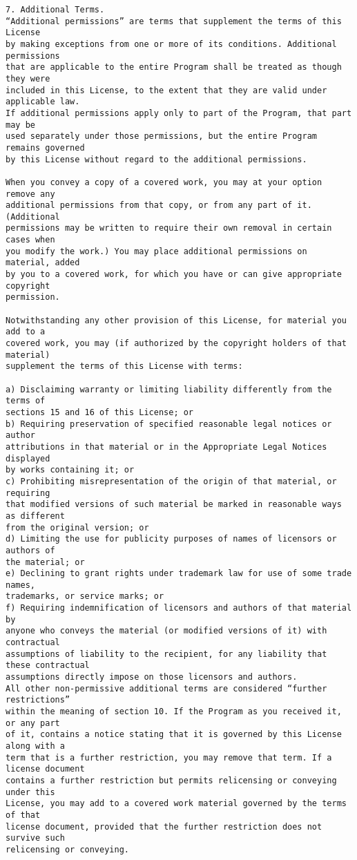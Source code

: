 \begin{verbatim}
7. Additional Terms.
“Additional permissions” are terms that supplement the terms of this License
by making exceptions from one or more of its conditions. Additional permissions
that are applicable to the entire Program shall be treated as though they were
included in this License, to the extent that they are valid under applicable law.
If additional permissions apply only to part of the Program, that part may be
used separately under those permissions, but the entire Program remains governed
by this License without regard to the additional permissions.

When you convey a copy of a covered work, you may at your option remove any
additional permissions from that copy, or from any part of it. (Additional
permissions may be written to require their own removal in certain cases when
you modify the work.) You may place additional permissions on material, added
by you to a covered work, for which you have or can give appropriate copyright
permission.

Notwithstanding any other provision of this License, for material you add to a
covered work, you may (if authorized by the copyright holders of that material)
supplement the terms of this License with terms:

a) Disclaiming warranty or limiting liability differently from the terms of
sections 15 and 16 of this License; or
b) Requiring preservation of specified reasonable legal notices or author
attributions in that material or in the Appropriate Legal Notices displayed
by works containing it; or
c) Prohibiting misrepresentation of the origin of that material, or requiring
that modified versions of such material be marked in reasonable ways as different
from the original version; or
d) Limiting the use for publicity purposes of names of licensors or authors of
the material; or
e) Declining to grant rights under trademark law for use of some trade names,
trademarks, or service marks; or
f) Requiring indemnification of licensors and authors of that material by
anyone who conveys the material (or modified versions of it) with contractual
assumptions of liability to the recipient, for any liability that these contractual
assumptions directly impose on those licensors and authors.
All other non-permissive additional terms are considered “further restrictions”
within the meaning of section 10. If the Program as you received it, or any part
of it, contains a notice stating that it is governed by this License along with a
term that is a further restriction, you may remove that term. If a license document
contains a further restriction but permits relicensing or conveying under this
License, you may add to a covered work material governed by the terms of that
license document, provided that the further restriction does not survive such
relicensing or conveying.


\end{verbatim}
